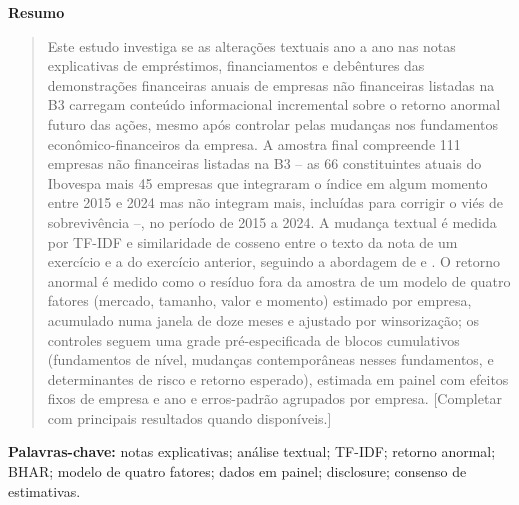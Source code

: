 \documentclass[a4paper,12pt]{report}
\renewenvironment{abstract}{
    \begin{center}
        \textbf{\abstractname}
    \end{center}
    \begin{quote}
}{\end{quote}}
\begin{document}
\renewcommand{\abstractname}{Resumo}
\begin{abstract}
    Este estudo investiga se as alterações textuais ano a ano nas notas explicativas de empréstimos, financiamentos e debêntures das demonstrações financeiras anuais de empresas não financeiras listadas na B3 carregam conteúdo informacional incremental sobre o retorno anormal futuro das ações, mesmo após controlar pelas mudanças nos fundamentos econômico-financeiros da empresa. A amostra final compreende 111 empresas não financeiras listadas na B3 -- as 66 constituintes atuais do Ibovespa mais 45 empresas que integraram o índice em algum momento entre 2015 e 2024 mas não integram mais, incluídas para corrigir o viés de sobrevivência --, no período de 2015 a 2024. A mudança textual é medida por TF-IDF e similaridade de cosseno entre o texto da nota de um exercício e a do exercício anterior, seguindo a abordagem de  e . O retorno anormal é medido como o resíduo fora da amostra de um modelo de quatro fatores (mercado, tamanho, valor e momento) estimado por empresa, acumulado numa janela de doze meses e ajustado por winsorização; os controles seguem uma grade pré-especificada de blocos cumulativos (fundamentos de nível, mudanças contemporâneas nesses fundamentos, e determinantes de risco e retorno esperado), estimada em painel com efeitos fixos de empresa e ano e erros-padrão agrupados por empresa. [Completar com principais resultados quando disponíveis.]
\end{abstract}

\noindent
\textbf{Palavras-chave:} notas explicativas; análise textual; TF-IDF; retorno anormal; BHAR; modelo de quatro fatores; dados em painel; disclosure; consenso de estimativas.
\thispagestyle{empty}
\newpage
\end{document}
